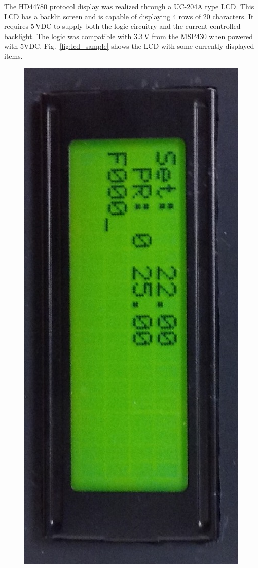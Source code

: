 The HD44780 protocol display was realized through a UC-204A type LCD.  This LCD has a backlit screen and is capable of displaying 4 rows of 20 characters.  It requires 5\,VDC to supply both the logic circuitry and the current controlled backlight. The logic was compatible with 3.3\,V from the MSP430 when powered with 5VDC. Fig.~\ref{fig:lcd_sample} shows the LCD with some currently displayed items.

\begin{figure}
\centering
\includegraphics[width=.9\textwidth]{LCD_sample.jpg}

\end{figure}
